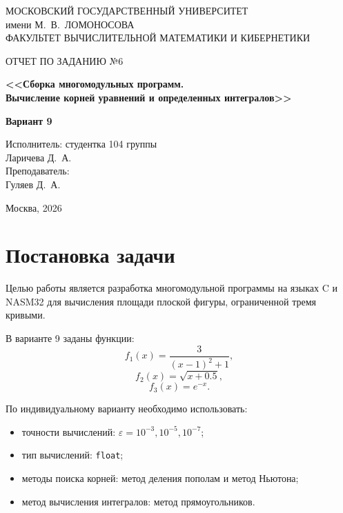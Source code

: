 \documentclass[a4paper,12pt]{article}
\begin{document}
\begin{titlepage}
\thispagestyle{empty}
\begin{center}
{\small
МОСКОВСКИЙ ГОСУДАРСТВЕННЫЙ УНИВЕРСИТЕТ\\
имени М.~В.~ЛОМОНОСОВА\\
ФАКУЛЬТЕТ ВЫЧИСЛИТЕЛЬНОЙ МАТЕМАТИКИ И КИБЕРНЕТИКИ
}

\vspace{5cm}

{\Large ОТЧЕТ ПО ЗАДАНИЮ №6}

\vspace{1.2cm}

\begin{minipage}{0.9\textwidth}
\centering
{\large\bfseries
<<Сборка многомодульных программ.\\
Вычисление корней уравнений и определенных интегралов>>
}
\end{minipage}

\vspace{1.2cm}

{\large\bfseries Вариант 9}
\end{center}

\vfill

\begin{flushright}
Исполнитель: студентка 104 группы\\
Ларичева Д.~А.\\[0.7cm]
Преподаватель:\\
Гуляев Д.~А.
\end{flushright}

\vfill

\begin{center}
Москва, 2026
\end{center}
\end{titlepage}

\tableofcontents
\newpage

\section{Постановка задачи}
Целью работы является разработка многомодульной программы на языках C и NASM32 для вычисления площади плоской фигуры, ограниченной тремя кривыми.

В варианте 9 заданы функции:
\[
f_1(x)=\frac{3}{(x-1)^2+1},
\]
\[
f_2(x)=\sqrt{x+0.5},
\]
\[
f_3(x)=e^{-x}.
\]

По индивидуальному варианту необходимо использовать:
\begin{itemize}
    \item точности вычислений: $\varepsilon=10^{-3},10^{-5},10^{-7}$;
    \item тип вычислений: \texttt{float};
    \item методы поиска корней: метод деления пополам и метод Ньютона;
    \item метод вычисления интегралов: метод прямоугольников.
\end{itemize}
\end{document}
